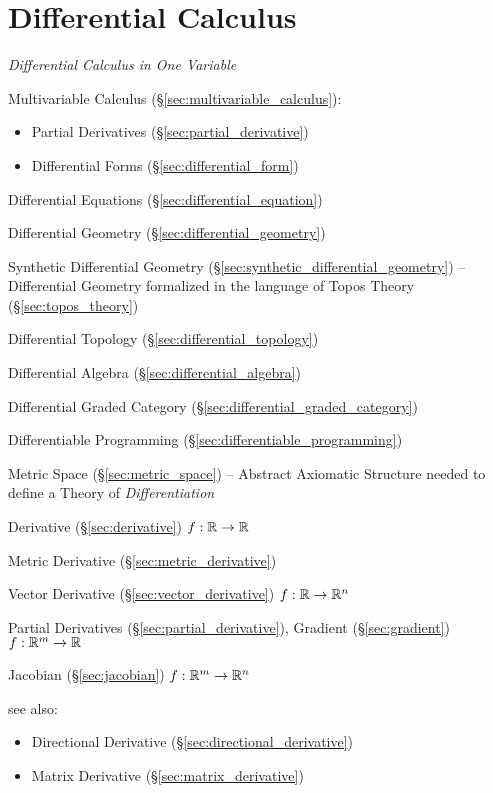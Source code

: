 \section{Differential Calculus}\label{sec:differential_calculus}

\emph{Differential Calculus in One Variable}

\fist Multivariable Calculus (\S\ref{sec:multivariable_calculus}):
\begin{itemize}
  \item Partial Derivatives (\S\ref{sec:partial_derivative})
  \item Differential Forms (\S\ref{sec:differential_form})
\end{itemize}

\fist Differential Equations (\S\ref{sec:differential_equation})

\fist Differential Geometry (\S\ref{sec:differential_geometry})

\fist Synthetic Differential Geometry
(\S\ref{sec:synthetic_differential_geometry}) --
Differential Geometry formalized in the language of Topos Theory
(\S\ref{sec:topos_theory})

\fist Differential Topology (\S\ref{sec:differential_topology})

\fist Differential Algebra (\S\ref{sec:differential_algebra})

\fist Differential Graded Category (\S\ref{sec:differential_graded_category})

\fist Differentiable Programming (\S\ref{sec:differentiable_programming})

\fist Metric Space (\S\ref{sec:metric_space}) -- Abstract Axiomatic Structure
needed to define a Theory of \emph{Differentiation}

Derivative (\S\ref{sec:derivative}) $f : \mathbb{R} \rightarrow \mathbb{R}$

Metric Derivative (\S\ref{sec:metric_derivative})

Vector Derivative (\S\ref{sec:vector_derivative})
$f : \mathbb{R} \rightarrow \mathbb{R}^n$

Partial Derivatives (\S\ref{sec:partial_derivative}), Gradient
(\S\ref{sec:gradient}) $f : \mathbb{R}^m \rightarrow \mathbb{R}$

Jacobian (\S\ref{sec:jacobian}) $f : \mathbb{R}^m \rightarrow \mathbb{R}^n$

see also:

\begin{itemize}
  \item Directional Derivative (\S\ref{sec:directional_derivative})
  \item Matrix Derivative (\S\ref{sec:matrix_derivative})
\end{itemize}

